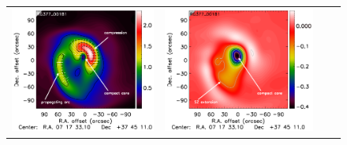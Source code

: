 \documentclass[traditabstract]{aa}
\begin{document}
\begin{figure}[h]
{\begin{tabular}{llll}
\includegraphics[trim=2.3cm 2.2cm 0cm 0cm, clip=true, scale=1]{Figure/Grad_RG377_00181_Ymap_zobs0p5_regrid_15_15_45.pdf} & 
\includegraphics[trim=2.3cm 2.2cm 0cm 0cm, clip=true, scale=1]{Figure/DoG_RG377_00181_Ymap_zobs0p5_regrid_15_15_45.pdf} \\

\end{tabular}}
\end{figure}
\end{document}
